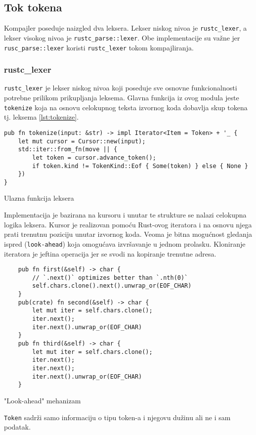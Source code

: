 \subsection{Tok tokena}

Kompajler poseduje naizgled dva leksera. Lekser niskog nivoa je \verb|rustc_lexer|, a lekser visokog nivoa je \verb|rustc_parse::lexer|. 
Obe implementacije su važne jer \verb|rusc_parse::lexer| koristi \verb|rustc_lexer| tokom kompajliranja.

\subsubsection{rustc\_lexer}

\verb|rustc_lexer| je lekser niskog nivoa koji poseduje sve osnovne
funkcionalnosti potrebne prilikom prikupljanja leksema.
Glavna funkcija iz ovog modula jeste \verb|tokenize| koja na osnovu celokupnog teksta 
izvornog koda dobavlja skup tokena tj. leksema \ref{lst:tokenize}.

\begin{listing}[H]
\begin{verbatim}
pub fn tokenize(input: &str) -> impl Iterator<Item = Token> + '_ {
    let mut cursor = Cursor::new(input);
    std::iter::from_fn(move || {
        let token = cursor.advance_token();
        if token.kind != TokenKind::Eof { Some(token) } else { None }
    })
}
\end{verbatim}
\caption{Ulazna funkcija leksera}
\label{lst:tokenize}
\end{listing}

Implementacija je bazirana na kursoru i unutar te strukture se nalazi celokupna logika leksera. 
Kursor je realizovan pomoću Rust-ovog iteratora i na osnovu njega prati trenutnu poziciju 
unutar izvornog koda. Veoma je bitna mogućnost gledanja ispred (\verb|look-ahead|) koja omogućava 
izvršavanje u jednom prolasku.
Kloniranje iteratora je jeftina operacija jer se svodi na kopiranje trenutne adresa.

\begin{listing}[H]
\begin{verbatim}
    pub fn first(&self) -> char {
        // `.next()` optimizes better than `.nth(0)`
        self.chars.clone().next().unwrap_or(EOF_CHAR)
    }
    pub(crate) fn second(&self) -> char {
        let mut iter = self.chars.clone();
        iter.next();
        iter.next().unwrap_or(EOF_CHAR)
    }
    pub fn third(&self) -> char {
        let mut iter = self.chars.clone();
        iter.next();
        iter.next();
        iter.next().unwrap_or(EOF_CHAR)
    }
\end{verbatim}
\caption{"Look-ahead" mehanizam}
\end{listing}
\verb|Token| sadrži samo informaciju o tipu token-a i njegovu dužinu ali ne i 
sam podatak.

